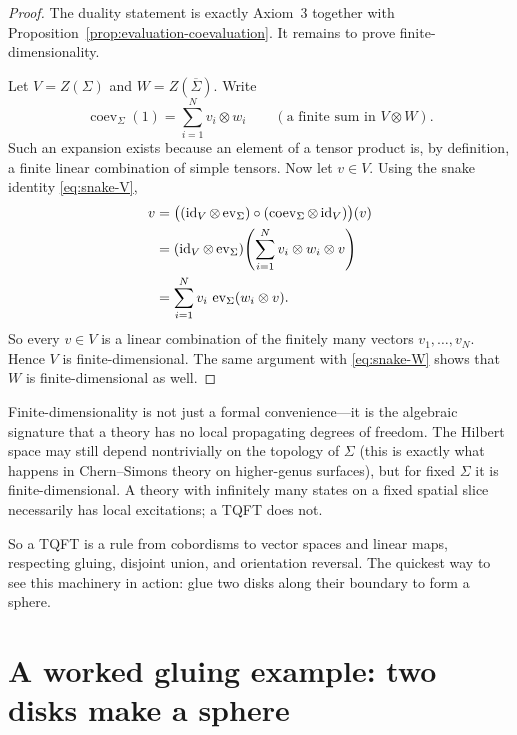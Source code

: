 \begin{proof}
The duality statement is exactly Axiom~3 together with Proposition~\ref{prop:evaluation-coevaluation}. It remains to prove finite-dimensionality.

\medskip

\noindent Let $V = Z(\Sigma)$ and $W = Z(\overline{\Sigma})$. Write
\begin{equation*}
\operatorname{coev}_{\Sigma}(1) = \sum_{i=1}^N v_i \otimes w_i
\qquad
(\text{a finite sum in } V \otimes W).
\end{equation*}
Such an expansion exists because an element of a tensor product is, by definition, a finite linear combination of simple tensors. Now let $v \in V$. Using the snake identity \eqref{eq:snake-V},
\begin{align*}
v
&=
\bigl((\operatorname{id}_V \otimes \operatorname{ev}_{\Sigma}) \circ (\operatorname{coev}_{\Sigma} \otimes \operatorname{id}_V)\bigr)(v) \\
&=
(\operatorname{id}_V \otimes \operatorname{ev}_{\Sigma})\!\left(\sum_{i=1}^N v_i \otimes w_i \otimes v\right) \\
&=
\sum_{i=1}^N v_i\, \operatorname{ev}_{\Sigma}(w_i \otimes v).
\end{align*}
So every $v \in V$ is a linear combination of the finitely many vectors $v_1,\ldots,v_N$. Hence $V$ is finite-dimensional. The same argument with \eqref{eq:snake-W} shows that $W$ is finite-dimensional as well.
\end{proof}

\begin{remark}\label{rem:fd-physics}
Finite-dimensionality is not just a formal convenience---it is the algebraic signature that a theory has no local propagating degrees of freedom. The Hilbert space may still depend nontrivially on the topology of $\Sigma$ (this is exactly what happens in Chern--Simons theory on higher-genus surfaces), but for fixed $\Sigma$ it is finite-dimensional. A theory with infinitely many states on a fixed spatial slice necessarily has local excitations; a TQFT does not.
\end{remark}

\medskip

\noindent So a TQFT is a rule from cobordisms to vector spaces and linear maps, respecting gluing, disjoint union, and orientation reversal.  The quickest way to see this machinery in action: glue two disks along their boundary to form a sphere.

\section{A worked gluing example: two disks make a sphere}\label{sec:two-disks-sphere}

